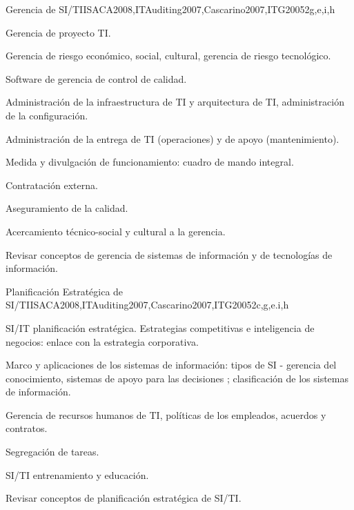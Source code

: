\begin{syllabus}
	\begin{unit}{Gerencia de SI/TI}{}{ISACA2008,ITAuditing2007,Cascarino2007,ITG2005}{2}{g,e,i,h}
	\begin{topics}
	\item Gerencia de proyecto TI.
	\item Gerencia de riesgo económico, social, cultural, gerencia de riesgo tecnológico.
	\item Software de gerencia de control de calidad.
	\item Administración de la infraestructura de TI y arquitectura de TI, administración de la configuración.
	\item Administración de la entrega de TI (operaciones) y de apoyo (mantenimiento).
	\item Medida y divulgación de funcionamiento: cuadro de mando integral.
	\item Contratación externa.
	\item Aseguramiento de la calidad.
	\item Acercamiento técnico-social y cultural a la gerencia.
	\end{topics}
	\begin{learningoutcomes}
	\item Revisar conceptos de gerencia de sistemas de información y de tecnologías de información.
	\end{learningoutcomes}
	\end{unit}
	
	\begin{unit}{Planificación Estratégica de SI/TI}{}{ISACA2008,ITAuditing2007,Cascarino2007,ITG2005}{2}{c,g,e.i,h}
	\begin{topics}
	\item SI/IT planificación estratégica. Estrategias competitivas e inteligencia de negocios: enlace con la estrategia corporativa.
	\item Marco y aplicaciones de los sistemas de información: tipos de SI - gerencia del conocimiento, sistemas de apoyo para las decisiones ; clasificación de los sistemas de información.
	\item Gerencia de recursos humanos de TI, políticas de los empleados, acuerdos y contratos.
	\item Segregación de tareas.
	\item SI/TI entrenamiento y educación.
	\end{topics}
	
	\begin{learningoutcomes}
	\item Revisar conceptos de planificación estratégica de SI/TI.
	\end{learningoutcomes}
	\end{unit}
	

\end{syllabus}

